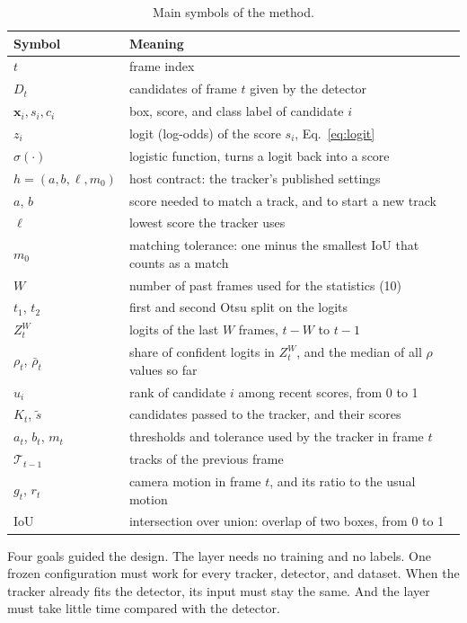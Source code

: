 \documentclass[pdflatex,sn-mathphys-num,iicol]{sn-jnl}
\begin{document}
\begin{table}[t]
\caption{Main symbols of the method.}
\label{tab:symbols}
\centering\footnotesize
\begin{tabular}{@{}l>{\raggedright\arraybackslash}p{51mm}@{}}
\toprule
Symbol & Meaning\\
\midrule
$t$ & frame index\\
$D_t$ & candidates of frame $t$ given by the detector\\
$\mathbf{x}_i, s_i, c_i$ & box, score, and class label of candidate $i$\\
$z_i$ & logit (log-odds) of the score $s_i$, Eq.~\eqref{eq:logit}\\
$\sigma(\cdot)$ & logistic function, turns a logit back into a score\\
$h=(a,b,\ell,m_0)$ & host contract: the tracker's published settings\\
$a$, $b$ & score needed to match a track, and to start a new track\\
$\ell$ & lowest score the tracker uses\\
$m_0$ & matching tolerance: one minus the smallest IoU that counts as a match\\
$W$ & number of past frames used for the statistics (10)\\
$t_1$, $t_2$ & first and second Otsu split on the logits\\
$Z_t^W$ & logits of the last $W$ frames, $t-W$ to $t-1$\\
$\rho_t$, $\bar\rho_t$ & share of confident logits in $Z_t^W$, and the median of all $\rho$ values so far\\
$u_i$ & rank of candidate $i$ among recent scores, from 0 to 1\\
$K_t$, $\tilde{s}$ & candidates passed to the tracker, and their scores\\
$a_t$, $b_t$, $m_t$ & thresholds and tolerance used by the tracker in frame $t$\\
$\mathcal{T}_{t-1}$ & tracks of the previous frame\\
$g_t$, $r_t$ & camera motion in frame $t$, and its ratio to the usual motion\\
IoU & intersection over union: overlap of two boxes, from 0 to 1\\
\bottomrule
\end{tabular}
\end{table}

Four goals guided the design. The layer needs no training and no labels. One
frozen configuration must work for every tracker, detector, and dataset.
When the tracker already fits the detector, its input must stay the same.
And the layer must take little time compared with the detector.
\end{document}
